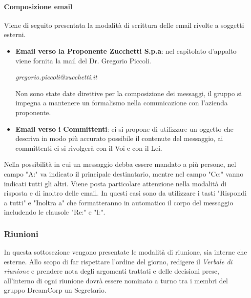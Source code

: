                 \paragraph{Composizione email}
                Viene di seguito presentata la modalità di scrittura delle email rivolte a soggetti esterni.
                \begin{itemize}
    
                    \item \textbf{Email verso la Proponente Zucchetti S.p.a}: nel capitolato d'appalto viene fornita la mail del Dr. Gregorio Piccoli.
                    \begin{center}
                        \textit{gregorio.piccoli@zucchetti.it}
                    \end{center}
                         
                    Non sono state date direttive per la composizione dei messaggi, il gruppo si impegna a mantenere un formalismo nella comunicazione con l'azienda proponente.
                    \item \textbf{Email verso i Committenti}: ci si propone di utilizzare un oggetto che descriva in modo più accurato possibile il contenute del messaggio, ai committenti ci si rivolgerà con il Voi e con il Lei.
    
                \end{itemize}
                Nella possibilità in cui un messaggio debba essere mandato a più persone, nel campo "A:" va indicato il principale destinatario, mentre nel campo "Cc:" vanno indicati tutti gli altri.
                Viene posta particolare attenzione nella modalità di risposta e di inoltro delle email. In questi casi sono da utilizzare i tasti "Rispondi a tutti" e "Inoltra a" che formatteranno in automatico il corpo del messaggio includendo le clausole "Re:" e "I:".
                \subsubsection{Riunioni}
                    In questa sottosezione vengono presentate le modalità di riunione, sia interne che esterne.
                    Allo scopo di far rispettare l'ordine del giorno, redigere il \textit{Verbale di riunione} e prendere nota degli argomenti trattati e delle decisioni prese, all'interno di ogni riunione dovrà essere nominato a turno tra i membri del gruppo DreamCorp un Segretario.

